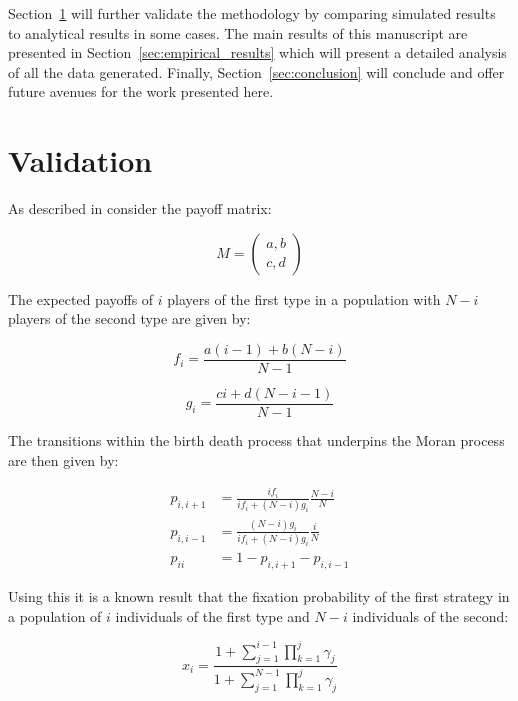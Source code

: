 \documentclass{article}
\begin{document}
Section~\ref{sec:validation} will further validate the methodology by comparing
simulated results to analytical results in some cases. The main results of this
manuscript are presented in Section~\ref{sec:empirical_results} which will
present a detailed analysis of all the data generated. Finally,
Section~\ref{sec:conclusion} will conclude and offer future avenues for the work
presented here.


\section{Validation}\label{sec:validation}

As described in \cite{Nowak} consider the payoff matrix:

\begin{equation}\label{equ:payoff_matrix}
    M = \begin{pmatrix}
        a, b\\
        c, d
        \end{pmatrix}
\end{equation}

The expected payoffs of \(i\) players of the first type in a population with \(N
- i\) players of the second type are given by:

\begin{equation}\label{equ:expected_payoff_one}
    f_i = \frac{a(i - 1) + b(N - i)}{N - 1}
\end{equation}

\begin{equation}\label{equ:expected_payoff_two}
    g_i = \frac{ci + d(N - i - 1)}{N - 1}
\end{equation}

The transitions within the birth death process that underpins the Moran process
are then given by:

\begin{align}
    p_{i, i+1}&= \frac{if_i}{if_i+(N-i)g_i}\frac{N-i}{N}\label{equ:p_up}\\
    p_{i, i-1}&= \frac{(N-i)g_i}{if_i+(N-i)g_i}\frac{i}{N}\label{equ:p_down}\\
    p_{ii} &= 1 - p_{i, i+1} - p_{i, i-1}\label{equ:p_stay}
\end{align}

Using this it is a known result \cite{Nowak2017} that the fixation probability
of the first strategy in a population of \(i\) individuals of the first type
and \(N-i\) individuals of the second:

\begin{equation}\label{equ:fixation_probability}
x_i = \frac{1 + \sum_{j=1}^{i-1}\prod_{k=1}^{j}\gamma_j}{1 + \sum_{j=1}^{N-1}
      \prod_{k=1}^{j}\gamma_j}
\end{equation}
\end{document}
